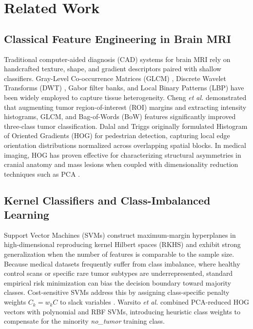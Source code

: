 \documentclass[conference]{IEEEtran}
\begin{document}
\section{Related Work}

\subsection{Classical Feature Engineering in Brain MRI}
Traditional computer-aided diagnosis (CAD) systems for brain MRI rely on handcrafted texture, shape, and gradient descriptors paired with shallow classifiers. Gray-Level Co-occurrence Matrices (GLCM) \cite{haralick1973textural}, Discrete Wavelet Transforms (DWT) \cite{chaplot2006classification}, Gabor filter banks, and Local Binary Patterns (LBP) have been widely employed to capture tissue heterogeneity. Cheng \emph{et al.} \cite{cheng2015enhanced} demonstrated that augmenting tumor region-of-interest (ROI) margins and extracting intensity histograms, GLCM, and Bag-of-Words (BoW) features significantly improved three-class tumor classification. Dalal and Triggs \cite{dalal2005histograms} originally formulated Histogram of Oriented Gradients (HOG) for pedestrian detection, capturing local edge orientation distributions normalized across overlapping spatial blocks. In medical imaging, HOG has proven effective for characterizing structural asymmetries in cranial anatomy and mass lesions when coupled with dimensionality reduction techniques such as PCA \cite{jolliffe2016principal}.

\subsection{Kernel Classifiers and Class-Imbalanced Learning}
Support Vector Machines (SVMs) \cite{cortes1995support} construct maximum-margin hyperplanes in high-dimensional reproducing kernel Hilbert spaces (RKHS) and exhibit strong generalization when the number of features is comparable to the sample size. Because medical datasets frequently suffer from class imbalance, where healthy control scans or specific rare tumor subtypes are underrepresented, standard empirical risk minimization can bias the decision boundary toward majority classes. Cost-sensitive SVMs address this by assigning class-specific penalty weights $C_k = w_k C$ to slack variables \cite{veropoulos1999controlling}. Warsito \emph{et al.} \cite{warsito2026lightweight} combined PCA-reduced HOG vectors with polynomial and RBF SVMs, introducing heuristic class weights to compensate for the minority \emph{no\_tumor} training class.
\end{document}
